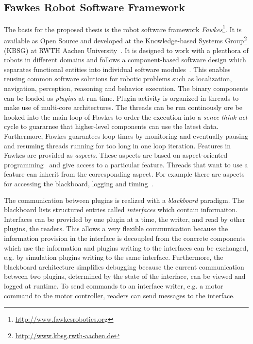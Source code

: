 \documentclass[a4paper,11pt]{article}
\begin{document}
\subsection{Fawkes Robot Software Framework}
\label{sec:fawkes}
The basis for the proposed thesis is the robot software framework
\emph{Fawkes}\footnote{\url{http://www.fawkesrobotics.org}}. It is
available as Open Source and developed at the Knowledge-based Systems
Group\footnote{\url{http://www.kbsg.rwth-aachen.de}} (KBSG) at RWTH
Aachen University~\cite{FawkesDesign}. It is designed to work with a
plenthora of robots in different domains and follows a component-based
software design which separates functional entities into individual
software modules~\cite{component}. This enables reusing common
software solutions for robotic problems such as localization,
navigation, perception, reasoning and behavior execution. The binary
components can be loaded as \emph{plugins} at run-time.
%
Plugin activity is organized in threads to make use of multi-core
architectures. The threads can be run continously ore be hooked into
the main-loop of Fawkes to order the execution into a
\emph{sence-think-act} cycle to guararnee that higher-level components
can use the latest data. Furthermore, Fawkes guarantees loop times by
monitoring and eventually pausing and resuming threads running for too
long in one loop iteration.
Features in Fawkes are provided as \textit{aspects}. These aspects are
based on aspect-oriented programming~\cite{aspect_oriented} and give
access to a particular feature. Threads that want to use a feature can
inherit from the corresponding aspect. For example there are aspects
for accessing the blackboard, logging and timing~\cite{tnthesis}.

The communication between plugins is realized with a \emph{blackboard}
paradigm. The blackboard lists structured entries called
\emph{interfaces} which contain informaiton. Interfaces can be
provided by one plugin at a time, the writer, and read by other
plugins, the readers. This allows a very flexible communication
because the information provision in the interface is decoupled from
the concrete components which use the information and plugins writing
to the interfaces can be exchanged, e.g. by simulation plugins writing
to the same interface. Furthermore, the blackboard architecture
simplifies debugging because the current communication between two
plugins, determined by the state of the interface, can be viewed and
logged at runtime. To send commands to an interface writer, e.g. a
motor command to the motor controller, readers can send messages to
the interface.
\end{document}
